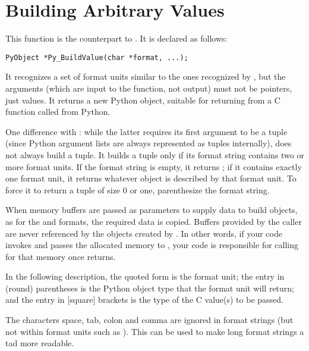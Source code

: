 \section{Building Arbitrary Values
         \label{buildValue}}

This function is the counterpart to .  It is
declared as follows:

\begin{verbatim}
PyObject *Py_BuildValue(char *format, ...);
\end{verbatim}

It recognizes a set of format units similar to the ones recognized by
, but the arguments (which are input to the
function, not output) must not be pointers, just values.  It returns a
new Python object, suitable for returning from a C function called
from Python.

One difference with : while the latter
requires its first argument to be a tuple (since Python argument lists
are always represented as tuples internally),
 does not always build a tuple.  It builds
a tuple only if its format string contains two or more format units.
If the format string is empty, it returns ; if it contains
exactly one format unit, it returns whatever object is described by
that format unit.  To force it to return a tuple of size 0 or one,
parenthesize the format string.

When memory buffers are passed as parameters to supply data to build
objects, as for the  and  formats, the required data
is copied.  Buffers provided by the caller are never referenced by the
objects created by .  In other words, if
your code invokes  and passes the allocated memory
to , your code is responsible for
calling  for that memory once
 returns.

In the following description, the quoted form is the format unit; the
entry in (round) parentheses is the Python object type that the format
unit will return; and the entry in [square] brackets is the type of
the C value(s) to be passed.

The characters space, tab, colon and comma are ignored in format
strings (but not within format units such as ).  This can be
used to make long format strings a tad more readable.

